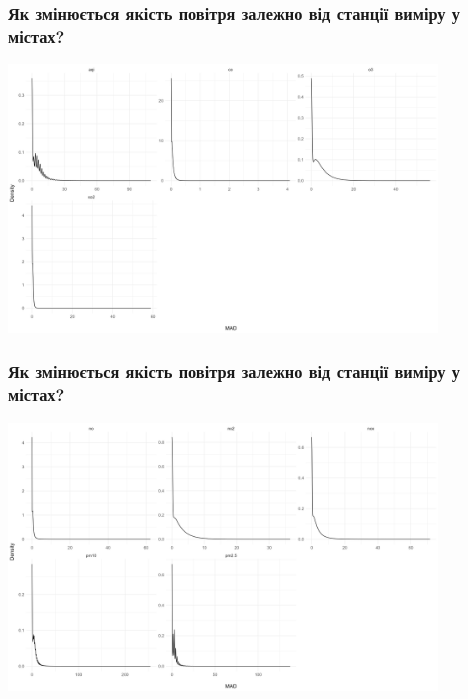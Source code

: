 \documentclass{beamer}
\begin{document}
\begin{frame}
  \frametitle{Як змінюється якість повітря залежно від станції виміру у містах?}

  \begin{center}
    \includegraphics[height=2.8in]{plots/question7/density-p1.png}
  \end{center}
\end{frame}

\begin{frame}
  \frametitle{Як змінюється якість повітря залежно від станції виміру у містах?}

  \begin{center}
    \includegraphics[height=2.8in]{plots/question7/density-p2.png}
  \end{center}
\end{frame}
\end{document}
